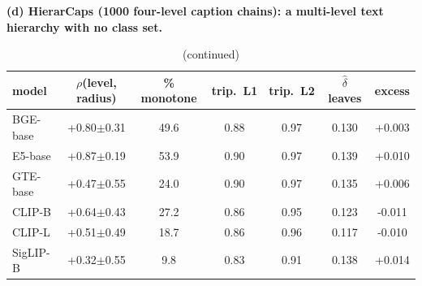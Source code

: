 \begin{table}[tbp]\ContinuedFloat
\centering
\scriptsize
\setlength{\tabcolsep}{2.6pt}
\begingroup
\noindent\textbf{(d) HierarCaps (1000 four-level caption chains): a multi-level text hierarchy with no class set.}\par\vspace{1.5pt}
\footnotesize
\setlength{\tabcolsep}{4pt}
\begin{tabular}{lcccccc}
\toprule
model & $\rho$(level, radius) & \% monotone & trip.\ L1 & trip.\ L2 & $\hat\delta$ leaves & excess \\
\midrule
BGE-base & +0.80$\pm$0.31 & 49.6 & 0.88 & 0.97 & 0.130 & +0.003 \\
E5-base & +0.87$\pm$0.19 & 53.9 & 0.90 & 0.97 & 0.139 & +0.010 \\
GTE-base & +0.47$\pm$0.55 & 24.0 & 0.90 & 0.97 & 0.135 & +0.006 \\
CLIP-B & +0.64$\pm$0.43 & 27.2 & 0.86 & 0.95 & 0.123 & -0.011 \\
CLIP-L & +0.51$\pm$0.49 & 18.7 & 0.86 & 0.96 & 0.117 & -0.010 \\
SigLIP-B & +0.32$\pm$0.55 & 9.8 & 0.83 & 0.91 & 0.138 & +0.014 \\
\bottomrule
\end{tabular}
\par\vspace{5pt}
\endgroup
\caption{(continued)}
\end{table}
